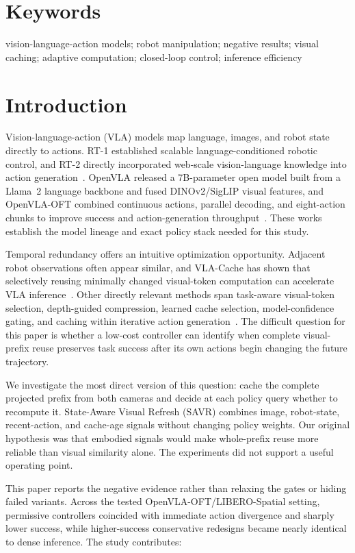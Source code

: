 \documentclass[11pt]{article}
\begin{document}
\section*{Keywords}
vision-language-action models; robot manipulation; negative results; visual caching; adaptive computation; closed-loop control; inference efficiency

\section{Introduction}

Vision-language-action (VLA) models map language, images, and robot state directly to actions. RT-1 established scalable language-conditioned robotic control, and RT-2 directly incorporated web-scale vision-language knowledge into action generation~\cite{rt1,rt2}. OpenVLA released a 7B-parameter open model built from a Llama~2 language backbone and fused DINOv2/SigLIP visual features, and OpenVLA-OFT combined continuous actions, parallel decoding, and eight-action chunks to improve success and action-generation throughput~\cite{openvla,openvlaoft}. These works establish the model lineage and exact policy stack needed for this study.

Temporal redundancy offers an intuitive optimization opportunity. Adjacent robot observations often appear similar, and VLA-Cache has shown that selectively reusing minimally changed visual-token computation can accelerate VLA inference~\cite{vlacache}. Other directly relevant methods span task-aware visual-token selection, depth-guided compression, learned cache selection, model-confidence gating, and caching within iterative action generation~\cite{efficientvla,depthcache,learnedcache,gatedcache,actioncache}. The difficult question for this paper is whether a low-cost controller can identify when complete visual-prefix reuse preserves task success after its own actions begin changing the future trajectory.

We investigate the most direct version of this question: cache the complete projected prefix from both cameras and decide at each policy query whether to recompute it. State-Aware Visual Refresh (SAVR) combines image, robot-state, recent-action, and cache-age signals without changing policy weights. Our original hypothesis was that embodied signals would make whole-prefix reuse more reliable than visual similarity alone. The experiments did not support a useful operating point.

This paper reports the negative evidence rather than relaxing the gates or hiding failed variants. Across the tested OpenVLA-OFT/LIBERO-Spatial setting, permissive controllers coincided with immediate action divergence and sharply lower success, while higher-success conservative redesigns became nearly identical to dense inference. The study contributes:
\end{document}
